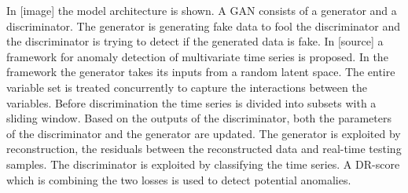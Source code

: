 In [image] the model architecture is shown. A GAN consists of a generator and a discriminator. The generator is generating fake data to fool the discriminator and the discriminator is trying to detect if the generated data is fake. In [source] a framework for anomaly detection of multivariate time series is proposed. In the framework the generator takes its inputs from a random latent space. The entire variable set is treated concurrently to capture the interactions between the variables. Before discrimination the time series is divided into subsets with a sliding window. Based on the outputs of the discriminator, both the parameters of the discriminator and the generator are updated. The generator is exploited by reconstruction, the residuals between the reconstructed data and real-time testing samples. The discriminator is exploited by classifying the time series. A DR-score which is combining the two losses is used to detect potential anomalies.